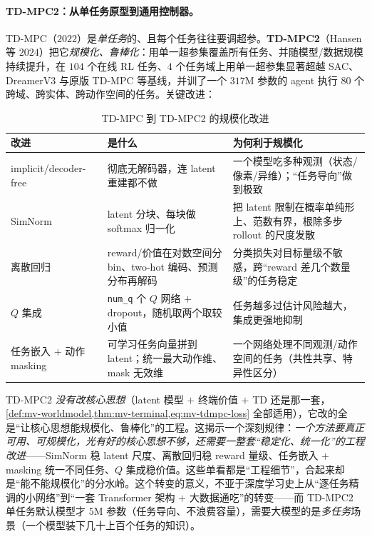 \paragraph{TD-MPC2：从单任务原型到通用控制器。}
TD-MPC（$2022$）是\emph{单任务}的、且每个任务往往要调超参。\textbf{TD-MPC2}（Hansen 等 $2024$）把它\emph{规模化、鲁棒化}：用单一超参集覆盖所有任务、并随模型/数据规模持续提升，在 $104$ 个在线 RL 任务、$4$ 个任务域上用单一超参集显著超越 SAC、DreamerV3 与原版 TD-MPC 等基线，并训了一个 $317$M 参数的 agent 执行 $80$ 个跨域、跨实体、跨动作空间的任务\cite{hansen2024tdmpc2}。关键改进：

\begin{table}[H]\centering\small
\caption{TD-MPC 到 TD-MPC2 的规模化改进}
\label{tab:mv-tdmpc2}
\begin{tabular}{p{} p{} p{}}
\toprule
改进 & 是什么 & 为何利于规模化 \\
\midrule
implicit/decoder-free & 彻底无解码器，连 latent 重建都不做 & 一个模型吃多种观测（状态/像素/异维）；“任务导向”做到极致 \\
SimNorm & latent 分块、每块做 softmax 归一化 & 把 latent 限制在概率单纯形上、范数有界，根除多步 rollout 的尺度发散 \\
离散回归 & reward/价值在对数空间分 bin、two-hot 编码、预测分布再解码 & 分类损失对目标量级不敏感，跨“reward 差几个数量级”的任务稳定 \\
$Q$ 集成 & \texttt{num\_q} 个 $Q$ 网络 $+$ dropout，随机取两个取较小值 & 任务越多过估计风险越大，集成更强地抑制 \\
任务嵌入 $+$ 动作 masking & 可学习任务向量拼到 latent；统一最大动作维、mask 无效维 & 一个网络处理不同观测/动作空间的任务（共性共享、特异性区分） \\
\bottomrule
\end{tabular}
\end{table}

\begin{insight}
TD-MPC2 \emph{没有改核心思想}（latent 模型 $+$ 终端价值 $+$ TD 还是那一套，\cref{def:mv-worldmodel,thm:mv-terminal,eq:mv-tdmpc-loss} 全部适用），它改的全是“让核心思想能规模化、鲁棒化”的工程。这揭示一个深刻规律：\emph{一个方法要真正可用、可规模化，光有好的核心思想不够，还需要一整套“稳定化、统一化”的工程改进}——SimNorm 稳 latent 尺度、离散回归稳 reward 量级、任务嵌入 $+$ masking 统一不同任务、$Q$ 集成稳价值。这些单看都是“工程细节”，合起来却是“能不能规模化”的分水岭。这个转变的意义，不亚于深度学习史上从“逐任务精调的小网络”到“一套 Transformer 架构 $+$ 大数据通吃”的转变——而 TD-MPC2 单任务默认模型才 $5$M 参数（任务导向、不浪费容量），需要大模型的是\emph{多任务}场景（一个模型装下几十上百个任务的知识）。
\end{insight}

